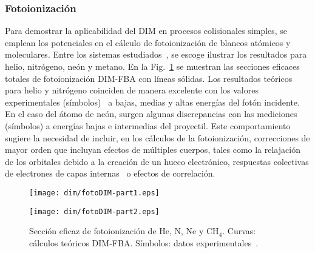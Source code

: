 \subsubsection{Fotoionización}

Para demostrar la aplicabilidad del DIM en procesos colisionales 
simples, se emplean los potenciales en el cálculo de fotoionización de 
blancos atómicos y moleculares. Entre los sistemas 
estudiados~\cite{Mendez:19dim}, se escoge ilustrar los 
resultados para helio, nitrógeno, neón y metano. En la 
Fig.~\ref{fig:photoDIM} se muestran las secciones eficaces totales de 
fotoionización DIM-FBA con líneas sólidas. Los resultados teóricos para 
helio y nitrógeno coinciden de manera excelente con los valores 
experimentales (símbolos)~\cite{Samson:90,Henke:93,Stolte:16} a bajas, 
medias y altas energías del fotón incidente. En el caso del átomo de 
neón, surgen algunas discrepancias con las mediciones (símbolos) 
\cite{Henke:93,Samson:02} a energías bajas e intermedias del proyectil. 
Este comportamiento sugiere la necesidad de incluir, en los cálculos de 
la fotoionización, correcciones de mayor orden que incluyan efectos de 
múltiples cuerpos, tales como la relajación de los orbitales 
debido a la creación de un hueco electrónico, respuestas colectivas de 
electrones de capas internas~\cite{Ederer:64} o efectos de correlación.

\begin{figure}
\centering
\texttt{[image: dim/fotoDIM-part1.eps]} 

\vspace{-1.15cm}
\texttt{[image: dim/fotoDIM-part2.eps]}
\caption[Fotoionización de He, N, Ne y CH$_4$.]
{Sección eficaz de fotoionización de He, N, Ne y CH$_4$. Curvas: 
cálculos teóricos DIM-FBA. Símbolos: datos 
experimentales~\cite{Samson:90,Henke:93,Stolte:16,Samson:02,
Lukirskii:64,Henke:82,Samson:89}.}
\label{fig:photoDIM}
\end{figure}

